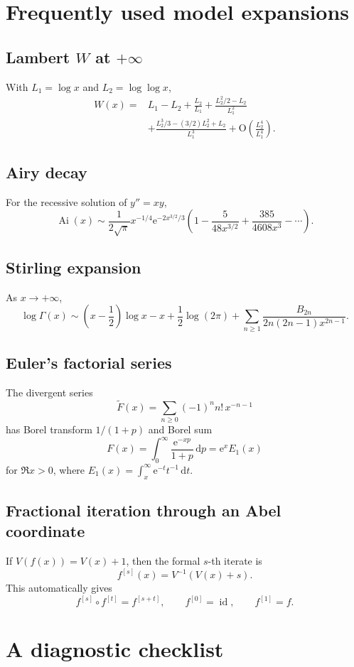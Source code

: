 \documentclass[11pt,openany]{book}
\theoremstyle{plain}
\theoremstyle{definition}
\theoremstyle{remark}
\newcommand{\bigO}{\mathrm{O}}
\newcommand{\dd}{\,\mathrm{d}}
\newcommand{\e}{\mathrm{e}}
\begin{document}
\section{Frequently used model expansions}

\subsection*{Lambert $W$ at $+\infty$}
With $L_1=\log x$ and $L_2=\log\log x$,
\begin{align*}
 W(x)={}&L_1-L_2+\frac{L_2}{L_1}
 +\frac{L_2^2/2-L_2}{L_1^2}\\
 &+\frac{L_2^3/3-(3/2)L_2^2+L_2}{L_1^3}
 +\bigO\!\left(\frac{L_2^4}{L_1^4}\right).
\end{align*}

\subsection*{Airy decay}
For the recessive solution of $y''=xy$,
\[
 \operatorname{Ai}(x)
 \sim\frac{1}{2\sqrt\pi}x^{-1/4}
 \e^{-2x^{3/2}/3}
 \left(1-\frac{5}{48x^{3/2}}
 +\frac{385}{4608x^3}-\cdots\right).
\]

\subsection*{Stirling expansion}
As $x\to+\infty$,
\[
 \log\Gamma(x)
 \sim\left(x-\frac12\right)\log x-x
 +\frac12\log(2\pi)
 +\sum_{n\ge1}
 \frac{B_{2n}}{2n(2n-1)x^{2n-1}}.
\]

\subsection*{Euler's factorial series}
The divergent series
\[
 \widetilde F(x)=\sum_{n\ge0}(-1)^n n!\,x^{-n-1}
\]
has Borel transform $1/(1+p)$ and Borel sum
\[
 F(x)=\int_0^\infty\frac{\e^{-xp}}{1+p}\dd p
 =\e^x E_1(x)
\]
for $\Re x>0$, where $E_1(x)=\int_x^\infty\e^{-t}t^{-1}\dd t$.

\subsection*{Fractional iteration through an Abel coordinate}
If $V(f(x))=V(x)+1$, then the formal $s$-th iterate is
\[
 f^{[s]}(x)=V^{-1}(V(x)+s).
\]
This automatically gives
\[
 f^{[s]}\circ f^{[t]}=f^{[s+t]},
 \qquad f^{[0]}=\operatorname{id},
 \qquad f^{[1]}=f.
\]

\section{A diagnostic checklist}
\end{document}
